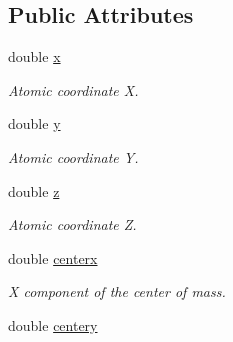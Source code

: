 \subsection*{Public Attributes}
\begin{DoxyCompactItemize}
\item 
\hypertarget{classCOORD__MC_a1f2430cd7731666b9202da65d4faf9e8}{
double \hyperlink{classCOORD__MC_a1f2430cd7731666b9202da65d4faf9e8}{x}}
\label{classCOORD__MC_a1f2430cd7731666b9202da65d4faf9e8}

\begin{DoxyCompactList}\small\item\em Atomic coordinate X. \item\end{DoxyCompactList}\item 
\hypertarget{classCOORD__MC_ad5d3a82a3fd22855a8a33506c5e00b79}{
double \hyperlink{classCOORD__MC_ad5d3a82a3fd22855a8a33506c5e00b79}{y}}
\label{classCOORD__MC_ad5d3a82a3fd22855a8a33506c5e00b79}

\begin{DoxyCompactList}\small\item\em Atomic coordinate Y. \item\end{DoxyCompactList}\item 
\hypertarget{classCOORD__MC_aaa8a639c2339542c24aa276181cc010d}{
double \hyperlink{classCOORD__MC_aaa8a639c2339542c24aa276181cc010d}{z}}
\label{classCOORD__MC_aaa8a639c2339542c24aa276181cc010d}

\begin{DoxyCompactList}\small\item\em Atomic coordinate Z. \item\end{DoxyCompactList}\item 
\hypertarget{classCOORD__MC_a20c1a707450f12d825043eb42c5beaa5}{
double \hyperlink{classCOORD__MC_a20c1a707450f12d825043eb42c5beaa5}{centerx}}
\label{classCOORD__MC_a20c1a707450f12d825043eb42c5beaa5}

\begin{DoxyCompactList}\small\item\em X component of the center of mass. \item\end{DoxyCompactList}\item 
\hypertarget{classCOORD__MC_af4cf1b3aa02305d0355533ce53de96ab}{
double \hyperlink{classCOORD__MC_af4cf1b3aa02305d0355533ce53de96ab}{centery}}
\label{classCOORD__MC_af4cf1b3aa02305d0355533ce53de96ab}


\end{DoxyCompactItemize}
